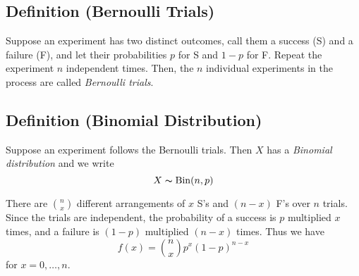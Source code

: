 \begin{defbox}
    \subsection{Definition (Bernoulli Trials)}
    Suppose an experiment has two distinct outcomes, call them a success (S)
    and a failure (F), and let their probabilities $ p $ for S and $ 1-p $ for F.
    Repeat the experiment $ n $ independent times. Then, the $ n $ individual
    experiments in the process are called \emph{Bernoulli trials}.
\end{defbox}
\begin{defbox}
    \subsection{Definition (Binomial Distribution)}
    Suppose an experiment follows the Bernoulli trials. Then $ X $ has a
    \emph{Binomial distribution} and we write
    \[ X \thicksim \operatorname{Bin}(n,p) \]
\end{defbox}


There are $ \binom{n}{x} $ different arrangements of $ x $ S's and $ (n-x) $ F's
over $ n $ trials. Since the trials are independent, the probability of a success
is $ p $ multiplied $ x $ times, and a failure is $ (1-p) $ multiplied $ (n-x) $ times.
Thus we have
\[ f(x)=\binom{n}{x}p^x(1-p)^{n-x} \]
for $ x=0,\ldots ,n $.